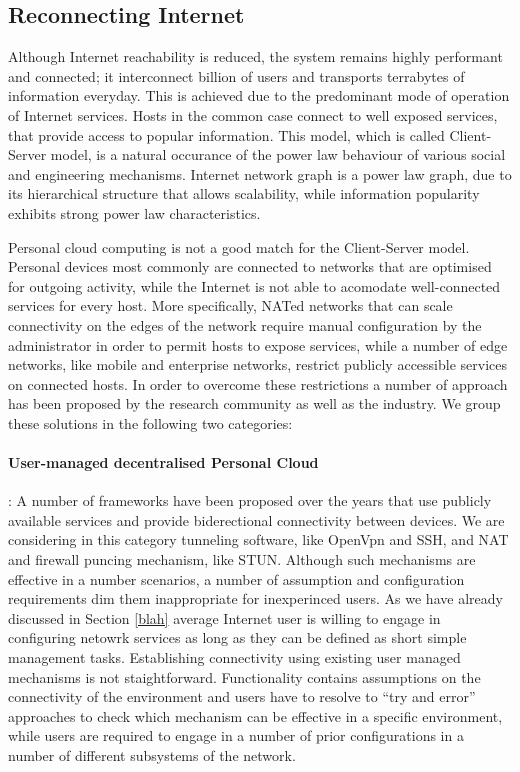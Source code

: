 \subsection{Reconnecting Internet} 


Although Internet reachability is reduced, the system remains highly performant
and connected; it interconnect billion of users and transports terrabytes of
information everyday. This is achieved due to the predominant mode of
operation of Internet services. Hosts in the common case connect to
well exposed services, that provide access to popular information. 
This model, which is called Client-Server model, is a natural occurance of the
power law behaviour of various social and engineering mechanisms. Internet
network graph is a power law graph, due to its hierarchical structure that
allows scalability, while information popularity exhibits strong power law
characteristics. 

Personal cloud computing is not a good match for the
Client-Server model. Personal devices most commonly are connected to networks
that are optimised for outgoing activity, while the Internet is not able to
acomodate well-connected services for every host. More
specifically, NATed networks that can scale connectivity on the edges of the
network require manual configuration by the administrator in order to permit
hosts to expose services, while a number of edge networks, like mobile and
enterprise networks, restrict publicly accessible services on connected
hosts. In order to overcome these restrictions a number of approach has been
proposed by the research community as well as the industry. We group these
solutions in the following two categories:

\paragraph*{User-managed decentralised Personal Cloud}: A number of 
frameworks have been proposed over the years that use publicly available
services and provide biderectional connectivity between devices. We are
considering in this category tunneling software, like OpenVpn and SSH, and 
NAT and firewall puncing mechanism, like STUN. Although such mechanisms are
effective in a number scenarios, a number of assumption and configuration
requirements dim them inappropriate for inexperinced users. As we have already
discussed in Section \ref{blah} average Internet user is willing to engage in
configuring netowrk services as long as they can be defined as short simple
management tasks. Establishing connectivity using existing user managed mechanisms is not
staightforward. Functionality contains assumptions on the connectivity of the
environment and users have to resolve to ``try and error'' approaches to check
which mechanism can be effective in a specific environment, while users are
required to engage in a number of prior configurations in a number of different
subsystems of the network. 

